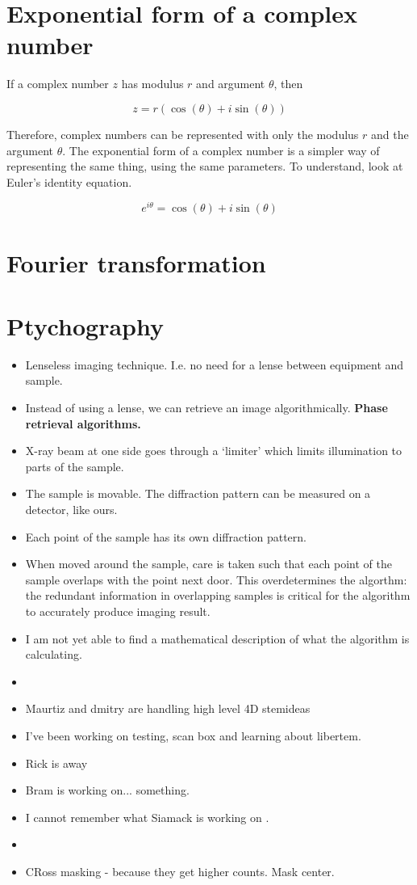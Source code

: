 \documentclass{article}
\begin{document}
    \section{Exponential form of a complex number}
    If a complex number $z$ has modulus $r$ and argument $\theta$, then

    \[z=r(\cos(\theta) + i \sin(\theta))\]

    Therefore, complex numbers can be represented with only the modulus $r$ and the argument $\theta$. The
    exponential form of a complex number is a simpler way of representing the same thing, using the same
    parameters. To understand, look at Euler's identity equation.

    \[e^{i\theta} = \cos(\theta) + i \sin(\theta) \]

    \section{Fourier transformation}

    \section{Ptychography}
    \begin{itemize}
        \item Lenseless imaging technique. I.e. no need for a lense between equipment and sample.
        \item Instead of using a lense, we can retrieve an image algorithmically. \bf{Phase retrieval algorithms}.
        \item X-ray beam at one side goes through a `limiter' which limits illumination to parts of the sample.
        \item The sample is movable. The diffraction pattern can be measured on a detector, like ours.
        \item Each point of the sample has its own diffraction pattern.
        \item When moved around the sample, care is taken such that each point of the sample overlaps with the
              point next door. This overdetermines the algorthm: the redundant information in overlapping samples
              is critical for the algorithm to accurately produce imaging result.
        \item I am not yet able to find a mathematical description of what the algorithm is calculating.
        \item
        \item Maurtiz and dmitry are handling high level 4D stemideas
        \item I've been working on testing, scan box and learning about libertem.
        \item Rick is away
        \item Bram is working on... something.
        \item I cannot remember what Siamack is working on .
        \item
        \item CRoss masking - because they get higher counts. Mask center. 

    \end{itemize}
\end{document}
